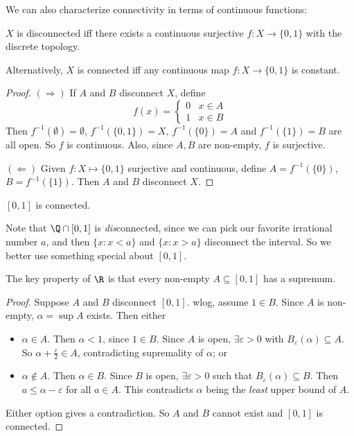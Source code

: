\documentclass[a4paper]{article}
\begin{document}
We can also characterize connectivity in terms of continuous functions:
\begin{prop}
  $X$ is disconnected iff there exists a continuous surjective $f: X\to \{0, 1\}$ with the discrete topology.

  Alternatively, $X$ is connected iff any continuous map $f: X \to \{0, 1\}$ is constant.
\end{prop}

\begin{proof}
  $(\Rightarrow)$ If $A$ and $B$ disconnect $X$, define
  \[
    f(x) =
    \begin{cases}
      0 & x\in A\\
      1 & x\in B
    \end{cases}
  \]
  Then $f^{-1}(\emptyset)=\emptyset$, $f^{-1}(\{0, 1\}) = X$, $f^{-1}(\{0\}) = A$ and $f^{-1}(\{1\}) = B$ are all open. So $f$ is continuous. Also, since $A, B$ are non-empty, $f$ is surjective.

  $(\Leftarrow)$ Given $f: X\mapsto \{0, 1\}$ surjective and continuous, define $A = f^{-1}(\{0\})$, $B = f^{-1}(\{1\})$. Then $A$ and $B$ disconnect $X$.
\end{proof}

\begin{thm}
  $[0, 1]$ is connected.
\end{thm}

Note that $\Q\cap [0, 1]$ is \emph{dis}connected, since we can pick our favorite irrational number $a$, and then $\{x: x < a\}$ and $\{x: x > a\}$ disconnect the interval. So we better use something special about $[0, 1]$.

The key property of $\R$ is that every non-empty $A\subseteq [0, 1]$ has a supremum.
\begin{proof}
  Suppose $A$ and $B$ disconnect $[0, 1]$. wlog, assume $1\in B$. Since $A$ is non-empty, $\alpha = \sup A$ exists. Then either
  \begin{itemize}
    \item $\alpha \in A$. Then $\alpha < 1$, since $1 \in B$. Since $A$ is open, $\exists \varepsilon > 0$ with $B_\varepsilon(\alpha) \subseteq A$. So $\alpha + \frac{\varepsilon}{2} \in A$, contradicting supremality of $\alpha$; or

    \item $\alpha \not\in A$. Then $\alpha \in B$. Since $B$ is open, $\exists \varepsilon > 0$ such that $B_\varepsilon (\alpha) \subseteq B$. Then $a \leq \alpha - \varepsilon$ for all $a\in A$. This contradicts $\alpha$ being the \emph{least} upper bound of $A$.
  \end{itemize}

  Either option gives a contradiction. So $A$ and $B$ cannot exist and $[0, 1]$ is connected.
\end{proof}
\end{document}
